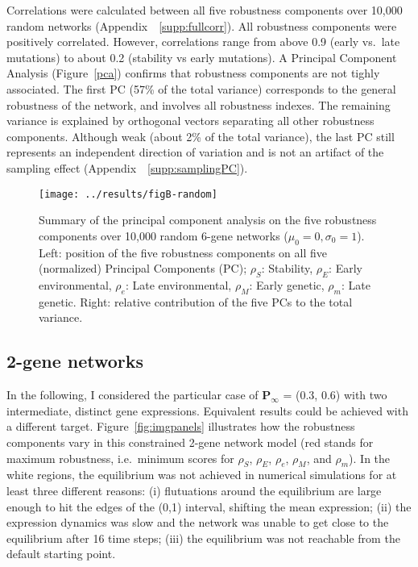 \documentclass[10pt,a4paper]{article}
\newcommand{\stability}{{\rho_S}}
\newcommand{\earlyenv}{{\rho_E}}
\newcommand{\lateenv}{{\rho_e}}
\newcommand{\earlymut}{{\rho_M}}
\newcommand{\latemut}{{\rho_m}}
\newcommand{\SupMat}{Appendix~}
\begin{document}
Correlations were calculated between all five robustness components over 10,000 random networks (\SupMat~\ref{supp:fullcorr}). All robustness components were positively correlated. However, correlations range from above 0.9 (early vs.\ late mutations) to about 0.2 (stability vs early mutations). A Principal Component Analysis (Figure~\ref{pca}) confirms that robustness components are not tighly associated. The first PC (57\% of the total variance) corresponds to the general robustness of the network, and involves all robustness indexes. The remaining variance is explained by orthogonal vectors separating all other robustness components. Although weak (about 2\% of the total variance), the last PC still represents an independent direction of variation and is not an artifact of the sampling effect (\SupMat~\ref{supp:samplingPC}). 

\begin{figure}[t]
\begin{center}
\texttt{[image: ../results/figB-random]}
\caption{\color{Gray} \label{fig:pca} Summary of the principal component analysis on the five robustness components over 10,000 random 6-gene networks ($\mu_0=0, \sigma_0=1$). Left: position of the five robustness components on all five (normalized) Principal Components (PC); $\stability$: Stability, $\earlyenv$: Early environmental, $\lateenv$: Late environmental, $\earlymut$: Early genetic, $\latemut$: Late genetic. Right: relative contribution of the five PCs to the total variance.}
\end{center}
\end{figure}

\subsection{2-gene networks}

In the following, I considered the particular case of $\bm P_\infty$ = (0.3, 0.6) with two intermediate, distinct gene expressions. Equivalent results could be achieved with a different target. Figure~\ref{fig:imgpanels} illustrates how the robustness components vary in this constrained 2-gene network model (red stands for maximum robustness, i.e.\ minimum scores for $\stability$, $\earlyenv$, $\lateenv$, $\earlymut$, and $\latemut$). In the white regions, the equilibrium was not achieved in numerical simulations for at least three different reasons: (i) flutuations around the equilibrium are large enough to hit the edges of the (0,1) interval, shifting the mean expression; (ii) the expression dynamics was slow and the network was unable to get close to the equilibrium after 16 time steps; (iii) the equilibrium was not reachable from the default starting point.
\end{document}
